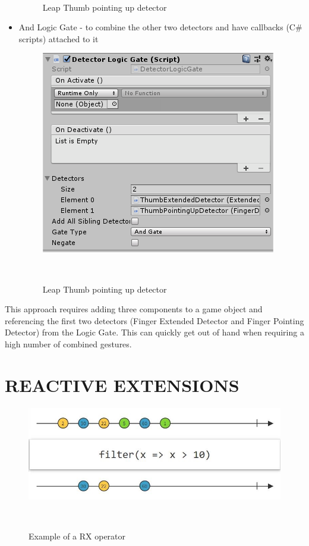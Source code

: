 \documentclass[chi_draft]{sigchi}
\begin{document}
\begin{itemize}
\begin{figure}[h]
      \caption{Leap Thumb pointing up detector}~\label{fig:figure3}
    \end{figure}
  \item And Logic Gate - to combine the other two detectors and have callbacks (C\# scripts) attached to it
    \begin{figure}[h]
      \centering
      \includegraphics[width=0.7\columnwidth]{figures/ThumbsUpDtector.PNG}
      \caption{Leap Thumb pointing up detector}~\label{fig:figure4}
    \end{figure}
\end{itemize}

This approach requires adding three components to a game object and referencing the first two detectors (Finger Extended Detector and Finger Pointing Detector) from the Logic Gate. This can quickly get out of hand when requiring a high number of combined gestures.

\section{REACTIVE EXTENSIONS}

\begin{figure}[H]
  \centering
  \includegraphics[width=0.9\columnwidth]{figures/RX_filter}
  \caption{Example of a RX operator}~\label{fig:figure5}
\end{figure}
  
\end{document}
